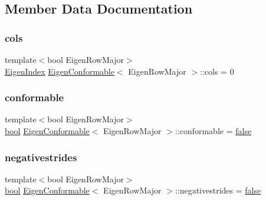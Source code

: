 \subsection{Member Data Documentation}
\mbox{\label{struct_eigen_conformable_a91d8590cd3f680d5c142367dc12f6ddd}} 
\subsubsection{\texorpdfstring{cols}{cols}}
{\footnotesize\ttfamily template$<$bool Eigen\+Row\+Major$>$ \\
\mbox{\hyperlink{eigen_8h_a4e595ab182718d84a409dd05e0829bdd}{Eigen\+Index}} \mbox{\hyperlink{struct_eigen_conformable}{Eigen\+Conformable}}$<$ Eigen\+Row\+Major $>$\+::cols = 0}

\mbox{\label{struct_eigen_conformable_a0350af318be37c2422635571601e238f}} 
\subsubsection{\texorpdfstring{conformable}{conformable}}
{\footnotesize\ttfamily template$<$bool Eigen\+Row\+Major$>$ \\
\mbox{\hyperlink{asdl_8h_af6a258d8f3ee5206d682d799316314b1}{bool}} \mbox{\hyperlink{struct_eigen_conformable}{Eigen\+Conformable}}$<$ Eigen\+Row\+Major $>$\+::conformable = \mbox{\hyperlink{asdl_8h_af6a258d8f3ee5206d682d799316314b1ae9de385ef6fe9bf3360d1038396b884c}{false}}}

\mbox{\label{struct_eigen_conformable_aa5b13a64eb1b8a64f4b7778315e44f21}} 
\subsubsection{\texorpdfstring{negativestrides}{negativestrides}}
{\footnotesize\ttfamily template$<$bool Eigen\+Row\+Major$>$ \\
\mbox{\hyperlink{asdl_8h_af6a258d8f3ee5206d682d799316314b1}{bool}} \mbox{\hyperlink{struct_eigen_conformable}{Eigen\+Conformable}}$<$ Eigen\+Row\+Major $>$\+::negativestrides = \mbox{\hyperlink{asdl_8h_af6a258d8f3ee5206d682d799316314b1ae9de385ef6fe9bf3360d1038396b884c}{false}}}

